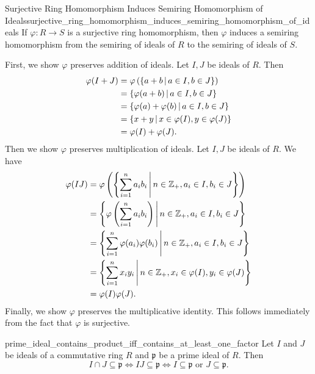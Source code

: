 \begin{proposition}{Surjective Ring Homomorphism Induces Semiring Homomorphism of Ideals}{surjective_ring_homomorphism_induces_semiring_homomorphism_of_ideals}
    If $\varphi:R\to S$ is a surjective ring homomorphism, then $\varphi$ induces a semiring homomorphism from the semiring of ideals of $R$ to the semiring of ideals of $S$.
\end{proposition}
\begin{prf}
    First, we show $\varphi$ preserves addition of ideals. Let $I,J$ be ideals of $R$. Then
    \begin{align*}
        \varphi(I+J)&=\varphi\left(\left\{a+b\,\middle\vert\, a\in I,b\in J\right\}\right)\\
        &=\left\{\varphi(a+b)\,\middle\vert\, a\in I,b\in J\right\}\\
        &=\left\{\varphi(a)+\varphi(b)\,\middle\vert\, a\in I,b\in J\right\}\\
        &=\left\{x+y\,\middle\vert\, x\in \varphi(I),y\in \varphi(J)\right\}\\
        &=\varphi(I)+\varphi(J).
    \end{align*}
    Then we show $\varphi$ preserves multiplication of ideals. Let $I,J$ be ideals of $R$. We have
    \begin{align*}
        \varphi(IJ)&=\varphi\left(\left\{\sum_{i=1}^n a_ib_i\,\middle\vert\, n\in\mathbb{Z}_{+},a_i\in I,b_i\in J\right\}\right)\\
        &=\left\{\varphi\left(\sum_{i=1}^n a_ib_i\right)\,\middle\vert\, n\in\mathbb{Z}_{+},a_i\in I,b_i\in J\right\}\\
        &=\left\{\sum_{i=1}^n \varphi(a_i)\varphi(b_i)\,\middle\vert\, n\in\mathbb{Z}_{+},a_i\in I,b_i\in J\right\}\\
        &=\left\{\sum_{i=1}^n x_iy_i\,\middle\vert\, n\in\mathbb{Z}_{+}, x_i\in \varphi(I),y_i\in \varphi(J)\right\}\\
        &=\varphi(I)\varphi(J).
    \end{align*}
    Finally, we show $\varphi$ preserves the multiplicative identity. This follows immediately from the fact that $\varphi$ is surjective.
\end{prf}

\begin{proposition}{}{prime_ideal_contains_product_iff_contains_at_least_one_factor}
    Let $I$ and $J$ be ideals of a commutative ring $R$ and $\mathfrak{p}$ be a prime ideal of $R$. Then 
    \[
        I\cap J\subseteq \mathfrak{p}\iff IJ\subseteq \mathfrak{p}\iff I\subseteq \mathfrak{p}\text{ or }J\subseteq \mathfrak{p}.
    \]
\end{proposition}

